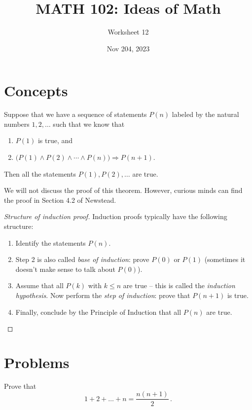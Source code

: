 \documentclass[12pt]{amsart}
\title{ MATH 102: Ideas  of Math }
\author{ Worksheet 12 }
\date{Nov 204, 2023}
\begin{document}
\maketitle

\section{Concepts}


\begin{theorem}
Suppose that we have a sequence of statements $P(n)$ labeled by the natural numbers $1,2,\dots$ such that we know that 
\begin{enumerate}
    \item $P(1)$ is true, and
    \item $\big( P(1) \wedge P(2) \wedge \cdots \wedge P(n) \big) \Rightarrow P(n+1)$.
\end{enumerate}
  Then all the statements $P(1), P(2), \dots$ are true.
\end{theorem}
We will not discuss the proof of this theorem. However, curious minds can find the proof
in Section 4.2 of Newstead.

\begin{proof}[Structure of induction proof]
    Induction proofs typically have the following structure:
\begin{enumerate}
\item Identify the statements $P(n)$.
\item Step 2 is also called \emph{base of induction}: prove $P(0)$ or $P(1)$ (sometimes it doesn't make sense to talk about $P(0)$).
\item Assume that all $P(k)$ with $k\leq n$ are true -- this is called the \emph{induction hypothesis}. Now perform the \emph{step of induction}: prove that $P(n+1)$ is true.
\item Finally, conclude by the Principle of Induction that all $P(n)$ are true.
\end{enumerate}
\end{proof}


\section{Problems}

\begin{problem}
    Prove that 
    \begin{equation*}
        1+2+\dots + n = \frac{n(n+1)}{2} \,.
    \end{equation*}
\end{problem}
\end{document}
